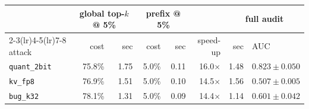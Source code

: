 \begin{tabular}{lrrrrrrl}
\toprule
& \multicolumn{2}{c}{global top-$k$ @ 5\%} & \multicolumn{2}{c}{prefix @ 5\%}
& & \multicolumn{2}{c}{full audit} \\
\cmidrule(lr){2-3}\cmidrule(lr){4-5}\cmidrule(lr){7-8}
attack & cost & sec & cost & sec & speed-up & sec & AUC \\
\midrule
\texttt{quant\_2bit} & 75.8\% & 1.75 & 5.0\% & 0.11 & 16.0$\times$ & 1.48 & $0.823 \pm 0.050$ \\
\texttt{kv\_fp8} & 76.9\% & 1.51 & 5.0\% & 0.10 & 14.5$\times$ & 1.56 & $0.507 \pm 0.005$ \\
\texttt{bug\_k32} & 78.1\% & 1.31 & 5.0\% & 0.09 & 14.4$\times$ & 1.14 & $0.601 \pm 0.042$ \\
\bottomrule
\end{tabular}
